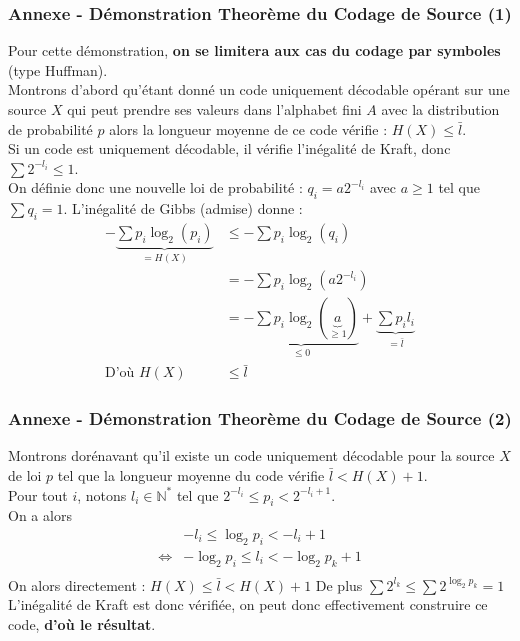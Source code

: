 \documentclass[aspectratio=43]{beamer}
\begin{document}
\begin{frame}
    \frametitle{Annexe - Démonstration Theorème du Codage de Source (1)}

    \footnotesize
    Pour cette démonstration, \textbf{on se limitera aux cas du codage par symboles} (type Huffman). \\
    Montrons d'abord qu'étant donné un code uniquement décodable opérant sur une source $X$ qui peut prendre ses valeurs dans l’alphabet fini $A$ avec la
    distribution de probabilité $p$ alors la longueur moyenne de ce code vérifie : \textbf{$H(X) \leqslant \bar{l}$}. \\
    \vspace*{1em}
    Si un code est uniquement décodable, il vérifie l'inégalité de Kraft, donc $\sum 2^{-l_i} \leqslant 1$. \\
    On définie donc une nouvelle loi de probabilité : $q_i = a2^{-l_i}$ avec $a \geqslant 1$ tel que $\sum q_i = 1$.
    L'inégalité de Gibbs (admise) donne : \begin{align*}
        - \underbrace{\sum p_i \log_2 (p_i)}_{= H(X)} & \leqslant - \sum p_i \log_2 (q_i) \\
        & = - \sum p_i \log_2 (a2^{-l_i}) \\
        & = \underbrace{-\sum p_i \log_2 (\underbrace{a}_{\geqslant 1})}_{\leqslant 0} + \underbrace{\sum p_i l_i}_{= \bar{l}} \\
        \text{D'où } H(X) & \leqslant \bar{l}
    \end{align*} 

\end{frame}

\begin{frame}
    \frametitle{Annexe - Démonstration Theorème du Codage de Source (2)}

    \footnotesize
    Montrons dorénavant qu'il existe un code uniquement décodable pour la source $X$ de loi $p$
    tel que la longueur moyenne du code vérifie $ \bar{l} < H(X) + 1$. \\
    \vspace*{1em}
    Pour tout $i$, notons $l_i \in \mathbb{N}^*$ tel que $2^{-l_i} \leqslant p_i < 2^{-l_i + 1}$. \\
    On a alors \begin{align*}
        &-l_i \leqslant \log_2 p_i < -l_i + 1 \\
        \iff &-\log_2 p_i \leqslant l_i < -\log_2 p_k + 1 \\
    \end{align*}
    On alors directement : $H(X) \leqslant \bar{l} < H(X) + 1$
    De plus $\sum 2^{l_k} \leqslant \sum 2^{\log_2 p_k} = 1$ \\
    L'inégalité de Kraft est donc vérifiée, on peut donc effectivement construire ce code, \textbf{d'où le résultat}.


\end{frame}
\end{document}
